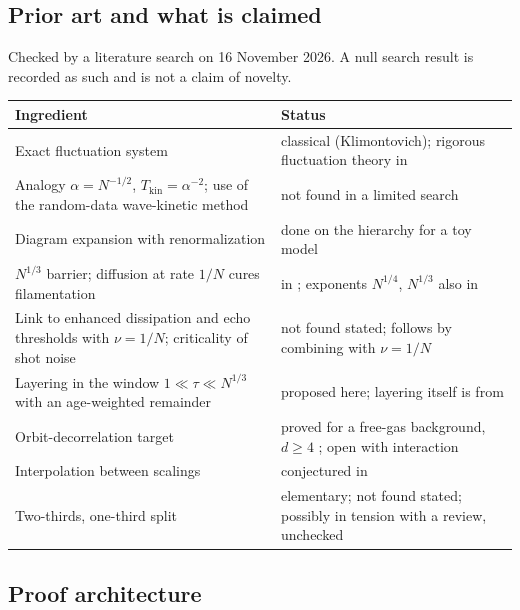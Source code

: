 \documentclass[11pt]{article}
\theoremstyle{definition}
\begin{document}
\subsection{Prior art and what is claimed}
\label{sec:prior}

Checked by a literature search on 16 November 2026. A null search result is
recorded as such and is not a claim of novelty.
\begin{center}
\renewcommand{\arraystretch}{1.4}
\begin{tabular}{>{\raggedright}p{5.2cm}p{9.0cm}}
  Ingredient & Status \\ \hline
  Exact fluctuation system & classical (Klimontovich); rigorous fluctuation
     theory in \cite{BraunHepp,Lancellotti} \\
  Analogy $\alpha = N^{-1/2}$, $T_{\mathrm{kin}} = \alpha^{-2}$; use of the
     random-data wave-kinetic method & not found in a limited search \\
  Diagram expansion with renormalization & done on the hierarchy for a toy
     model \cite{DuerinckxLeBihan} \\
  $N^{1/3}$ barrier; diffusion at rate $1/N$ cures filamentation & in
     \cite{DuerinckxLeBihan}; exponents $N^{1/4}$, $N^{1/3}$ also in
     \cite{BodineauLeBris} \\
  Link to enhanced dissipation and echo thresholds with $\nu = 1/N$;
     criticality of shot noise & not found stated; follows by combining
     \cite{Bedrossian17,CLN,ZhaoZi} with $\nu = 1/N$ \\
  Layering in the window $1\ll\tau\ll N^{1/3}$ with an age-weighted
     remainder & proposed here; layering itself is from
     \cite{DHM1,DH-long} \\
  Orbit-decorrelation target & proved for a free-gas background, $d\ge 4$
     \cite{BodineauLeBris}; open with interaction \\
  Interpolation between scalings & conjectured in \cite{NVW} \\
  Two-thirds, one-third split & elementary; not found stated; possibly in
     tension with a review, unchecked \\
\end{tabular}
\end{center}

\subsection{Proof architecture}
\end{document}
